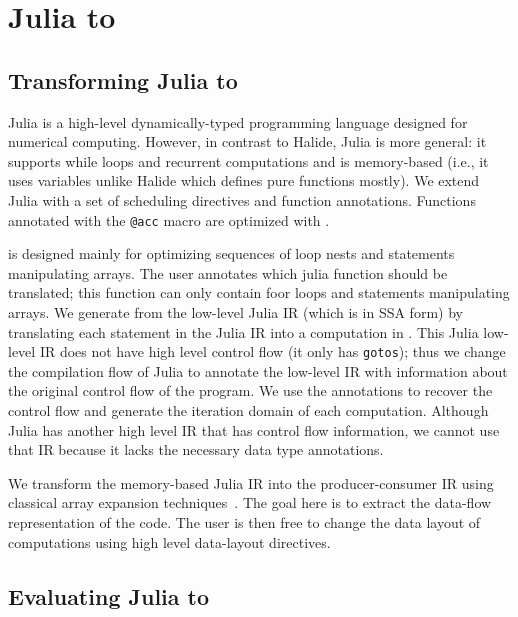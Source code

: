 \section{Julia to \framework{}}

\subsection{Transforming Julia to \framework{}}

Julia is a high-level dynamically-typed programming language designed for numerical computing.  
However, in contrast to Halide, Julia is more general: it supports while loops and recurrent computations and is memory-based (i.e., it uses variables unlike Halide which defines pure functions mostly).
We extend Julia with a set of scheduling directives and function annotations.  Functions annotated with the \lstinline{@acc} macro are optimized with \framework{}.

\framework{} is designed mainly for optimizing sequences of loop nests and statements manipulating arrays.  The user annotates which julia function should be translated; this function can only contain foor loops and statements manipulating arrays.
We generate \framework{} from the low-level Julia IR (which is in SSA form) by translating each statement in the Julia IR into a computation in \framework{}.  This Julia low-level IR does not have high level control flow (it only has \lstinline{gotos}); thus we change the compilation flow of Julia to annotate the low-level IR with information about the original control flow of the program.  We use the annotations to recover the control flow and generate the iteration domain of each computation.  Although Julia has another high level IR that has control flow information, we cannot use that IR because it lacks the necessary data type annotations.

We transform the memory-based Julia IR into the producer-consumer \framework{} IR using classical array expansion techniques~\cite{feautrier_array_1988,midkiff_automatic_2012,maydan_array-data_1993}.  The goal here is to extract the data-flow representation of the code.  The user is then free to change the data layout of computations using high level data-layout directives. %

\subsection{Evaluating Julia to \framework}

